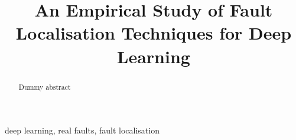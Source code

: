 \documentclass[conference]{IEEEtran}
\begin{document}
\title{An Empirical Study of Fault Localisation Techniques for Deep Learning}

\makeatletter
\newcommand{\linebreakand}{%
  \end{@IEEEauthorhalign}
  \hfill\mbox{}\par
  \mbox{}\hfill\begin{@IEEEauthorhalign}
}
\makeatother

 \author{\author{}}

\maketitle

\begin{abstract}
Dummy abstract

\end{abstract}

\begin{IEEEkeywords}
deep learning, real faults, fault localisation
\end{IEEEkeywords}



%


%





%
%

\balance
%


\vspace{12pt}
\end{document}
